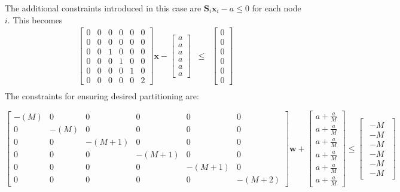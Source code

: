 \documentclass[authoryear,preprint,review,12pt]{elsarticle}
\begin{document}
The additional constraints introduced in this case are $\mathbf{S}_{i}\mathbf{x}_{i}-a\leq0$
for each node $i$. This becomes
\begin{eqnarray*}
\left[\begin{array}{cccccc}
0 & 0 & 0 & 0 & 0 & 0\\
0 & 0 & 0 & 0 & 0 & 0\\
0 & 0 & 1 & 0 & 0 & 0\\
0 & 0 & 0 & 1 & 0 & 0\\
0 & 0 & 0 & 0 & 1 & 0\\
0 & 0 & 0 & 0 & 0 & 2
\end{array}\right]\mathbf{x}-\left[\begin{array}{c}
a\\
a\\
a\\
a\\
a\\
a
\end{array}\right] & \leq & \left[\begin{array}{c}
0\\
0\\
0\\
0\\
0\\
0
\end{array}\right]\\
\end{eqnarray*}
 The constraints for ensuring desired partitioning are:


\[
\left[\begin{array}{cccccc}
-(M) & 0 & 0 & 0 & 0 & 0\\
0 & -(M) & 0 & 0 & 0 & 0\\
0 & 0 & -(M+1) & 0 & 0 & 0\\
0 & 0 & 0 & -(M+1) & 0 & 0\\
0 & 0 & 0 & 0 & -(M+1) & 0\\
0 & 0 & 0 & 0 & 0 & -(M+2)
\end{array}\right]\mathbf{w}+\left[\begin{array}{c}
a+\frac{a}{M}\\
a+\frac{a}{M}\\
a+\frac{a}{M}\\
a+\frac{a}{M}\\
a+\frac{a}{M}\\
a+\frac{a}{M}
\end{array}\right]\leq\left[\begin{array}{c}
\begin{array}{c}
-M\\
-M\\
-M\\
-M\\
-M\\
-M
\end{array}\end{array}\right]
\]
\end{document}
